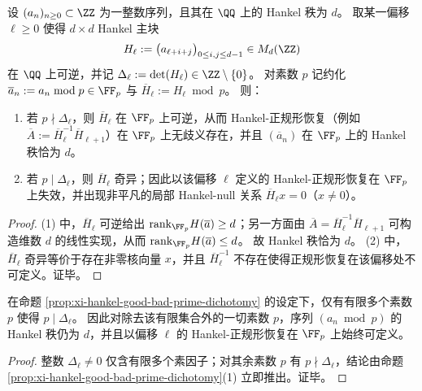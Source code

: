\begin{proposition}\label{prop:xi-hankel-good-bad-prime-dichotomy}
设 \((a_n)_{n\ge 0}\subset\ZZ\) 为一整数序列，且其在 \(\QQ\) 上的 Hankel 秩为 \(d\)。
取某一偏移 \(\ell\ge 0\) 使得 \(d\times d\) Hankel 主块
\[
H_\ell:=\bigl(a_{\ell+i+j}\bigr)_{0\le i,j\le d-1}\in M_d(\ZZ)
\]
在 \(\QQ\) 上可逆，并记 \(\Delta_\ell:=\det(H_\ell)\in\ZZ\setminus\{0\}\)。
对素数 \(p\) 记约化 \(\overline a_n:=a_n\bmod p\in\FF_p\) 与 \(\overline H_\ell:=H_\ell\bmod p\)。
则：
\begin{enumerate}
  \item 若 \(p\nmid \Delta_\ell\)，则 \(\overline H_\ell\) 在 \(\FF_p\) 上可逆，从而 Hankel-正规形恢复（例如 \(\overline A:=\overline H_\ell^{-1}\overline H_{\ell+1}\)）在 \(\FF_p\) 上无歧义存在，并且 \((\overline a_n)\) 在 \(\FF_p\) 上的 Hankel 秩恰为 \(d\)。
  \item 若 \(p\mid \Delta_\ell\)，则 \(\overline H_\ell\) 奇异；因此以该偏移 \(\ell\) 定义的 Hankel-正规形恢复在 \(\FF_p\) 上失效，并出现非平凡的局部 Hankel-null 关系 \(\overline H_\ell x=0\)（\(x\neq 0\)）。
\end{enumerate}
\end{proposition}
\begin{proof}
(1) 中，\(\overline H_\ell\) 可逆给出 \(\mathrm{rank}_{\FF_p}H(\overline a)\ge d\)；另一方面由 \(\overline A=\overline H_\ell^{-1}\overline H_{\ell+1}\) 可构造维数 \(d\) 的线性实现，从而 \(\mathrm{rank}_{\FF_p}H(\overline a)\le d\)。
故 Hankel 秩恰为 \(d\)。
(2) 中，\(\overline H_\ell\) 奇异等价于存在非零核向量 \(x\)，并且 \(\overline H_\ell^{-1}\) 不存在使得正规形恢复在该偏移处不可定义。证毕。
\end{proof}

\begin{corollary}\label{cor:xi-hankel-finite-bad-primes-rank-stability}
在命题 \ref{prop:xi-hankel-good-bad-prime-dichotomy} 的设定下，仅有有限多个素数 \(p\) 使得 \(p\mid \Delta_\ell\)。
因此对除去该有限集合外的一切素数 \(p\)，序列 \((a_n\bmod p)\) 的 Hankel 秩仍为 \(d\)，并且以偏移 \(\ell\) 的 Hankel-正规形恢复在 \(\FF_p\) 上始终可定义。
\end{corollary}
\begin{proof}
整数 \(\Delta_\ell\neq 0\) 仅含有限多个素因子；对其余素数 \(p\) 有 \(p\nmid \Delta_\ell\)，结论由命题 \ref{prop:xi-hankel-good-bad-prime-dichotomy}(1) 立即推出。证毕。
\end{proof}

